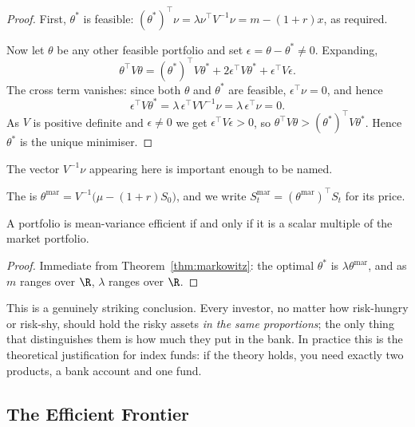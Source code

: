 \begin{proof}
	First, $\theta^*$ is feasible: $(\theta^*)^\top \nu = \lambda \nu^\top V^{-1}\nu = m - (1+r)x$, as required.

	Now let $\theta$ be any other feasible portfolio and set $\epsilon = \theta - \theta^* \neq 0$. Expanding,
	$$
	\theta^\top V \theta = (\theta^*)^\top V \theta^* + 2\epsilon^\top V \theta^* + \epsilon^\top V \epsilon.
	$$
	The cross term vanishes: since both $\theta$ and $\theta^*$ are feasible, $\epsilon^\top \nu = 0$, and hence
	$$
	\epsilon^\top V \theta^* = \lambda\, \epsilon^\top V V^{-1}\nu = \lambda\, \epsilon^\top \nu = 0.
	$$
	As $V$ is positive definite and $\epsilon \neq 0$ we get $\epsilon^\top V\epsilon > 0$, so $\theta^\top V\theta > (\theta^*)^\top V\theta^*$. Hence $\theta^*$ is the unique minimiser.
\end{proof}

The vector $V^{-1}\nu$ appearing here is important enough to be named.

\begin{definition}
	The  is $\theta^{\mathrm{mar}} = V^{-1}\big(\mu - (1+r)S_0\big)$, and we write $S_t^{\mathrm{mar}} = (\theta^{\mathrm{mar}})^\top S_t$ for its price.
\end{definition}

\begin{corollary}
	A portfolio is mean-variance efficient if and only if it is a scalar multiple of the market portfolio.
\end{corollary}

\begin{proof}
	Immediate from Theorem~\ref{thm:markowitz}: the optimal $\theta^*$ is $\lambda \theta^{\mathrm{mar}}$, and as $m$ ranges over $\R$, $\lambda$ ranges over $\R$.
\end{proof}

This is a genuinely striking conclusion. Every investor, no matter how risk-hungry or risk-shy, should hold the risky assets \emph{in the same proportions}; the only thing that distinguishes them is how much they put in the bank. In practice this is the theoretical justification for index funds: if the theory holds, you need exactly two products, a bank account and one fund.

\subsection{The Efficient Frontier}

